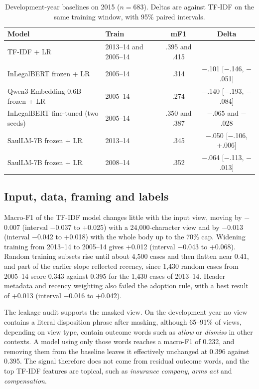 \documentclass[journal]{IEEEtran}
\begin{document}
\begin{table}[!t]\centering\footnotesize
\caption{Development-year baselines on 2015 ($n=683$). Deltas are against TF-IDF on the same training window, with 95\% paired intervals.}\label{tab:baselines}
\begin{tabular}{@{}llcc@{}}\toprule
Model & Train & mF1 & Delta\\\midrule
TF-IDF + LR & 2013--14 and 2005--14 & .395 and .415 & \\
InLegalBERT frozen + LR & 2005--14 & .314 & $-$.101 [$-$.146, $-$.051]\\
Qwen3-Embedding-0.6B frozen + LR & 2005--14 & .274 & $-$.140 [$-$.193, $-$.084]\\
InLegalBERT fine-tuned (two seeds) & 2005--14 & .350 and .387 & $-$.065 and $-$.028\\
SaulLM-7B frozen + LR & 2013--14 & .345 & $-$.050 [$-$.106, +.006]\\
SaulLM-7B frozen + LR & 2008--14 & .352 & $-$.064 [$-$.113, $-$.013]\\\bottomrule
\end{tabular}\end{table}

\subsection{Input, data, framing and labels}
Macro-F1 of the TF-IDF model changes little with the input view, moving by $-$0.007 (interval $-$0.037 to +0.025) with a 24,000-character view and by $-$0.013 (interval $-$0.042 to +0.018) with the whole body up to the 70\% cap. Widening training from 2013--14 to 2005--14 gives +0.012 (interval $-$0.043 to +0.068). Random training subsets rise until about 4,500 cases and then flatten near 0.41, and part of the earlier slope reflected recency, since 1,430 random cases from 2005--14 score 0.343 against 0.395 for the 1,430 cases of 2013--14. Header metadata and recency weighting also failed the adoption rule, with a best result of +0.013 (interval $-$0.016 to +0.042).

The leakage audit supports the masked view. On the development year no view contains a literal disposition phrase after masking, although 65--91\% of views, depending on view type, contain outcome words such as \emph{allow} or \emph{dismiss} in other contexts. A model using only those words reaches a macro-F1 of 0.232, and removing them from the baseline leaves it effectively unchanged at 0.396 against 0.395. The signal therefore does not come from residual outcome words, and the top TF-IDF features are topical, such as \emph{insurance company}, \emph{arms act} and \emph{compensation}.
\end{document}
